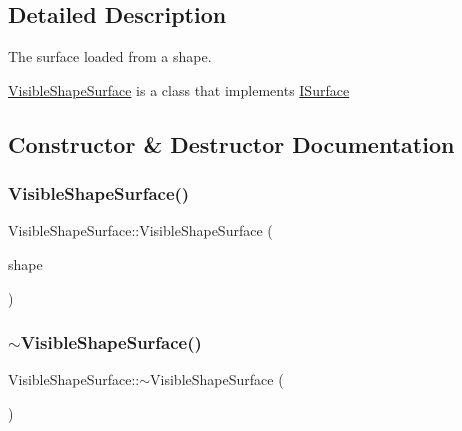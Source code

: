 \subsection{Detailed Description}
The surface loaded from a shape. 

\mbox{\hyperlink{class_visible_shape_surface}{Visible\+Shape\+Surface}} is a class that implements \mbox{\hyperlink{class_i_surface}{I\+Surface}} 

\subsection{Constructor \& Destructor Documentation}
\mbox{\label{class_visible_shape_surface_a6ee7d8b8d3e77bce2305085c42cccde9}} 
\subsubsection{\texorpdfstring{Visible\+Shape\+Surface()}{VisibleShapeSurface()}}
{\footnotesize\ttfamily Visible\+Shape\+Surface\+::\+Visible\+Shape\+Surface (\begin{DoxyParamCaption}\item[{const \mbox{\hyperlink{class_visible_shape}{Visible\+Shape}} \&}]{shape }\end{DoxyParamCaption})}

\mbox{\label{class_visible_shape_surface_a5fd68bb1de0c3b37d54a22201f443fa3}} 
\subsubsection{\texorpdfstring{$\sim$\+Visible\+Shape\+Surface()}{~VisibleShapeSurface()}}
{\footnotesize\ttfamily Visible\+Shape\+Surface\+::$\sim$\+Visible\+Shape\+Surface (\begin{DoxyParamCaption}{ }\end{DoxyParamCaption})\hspace{0.3cm}{\ttfamily [virtual]}}



